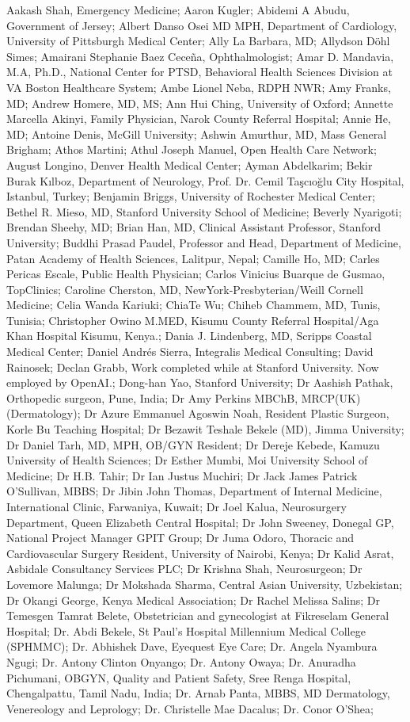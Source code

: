 Aakash Shah, Emergency Medicine; Aaron Kugler; Abidemi A Abudu, Government of Jersey; Albert Danso Osei MD MPH, Department of Cardiology, University of Pittsburgh Medical Center; Ally La Barbara, MD; Allydson Döhl Simes; Amairani Stephanie Baez Ceceña, Ophthalmologist; Amar D. Mandavia, M.A, Ph.D., National Center for PTSD, Behavioral Health Sciences Division at VA Boston Healthcare System; Ambe Lionel Neba, RDPH NWR; Amy Franks, MD; Andrew Homere, MD, MS; Ann Hui Ching, University of Oxford; Annette Marcella Akinyi, Family Physician, Narok County Referral Hospital; Annie He, MD; Antoine Denis, McGill University; Ashwin Amurthur, MD, Mass General Brigham; Athos Martini; Athul Joseph Manuel, Open Health Care Network; August Longino, Denver Health Medical Center; Ayman Abdelkarim; Bekir Burak Kılboz, Department of Neurology, Prof. Dr. Cemil Taşcıoğlu City Hospital, Istanbul, Turkey; Benjamin Briggs, University of Rochester Medical Center; Bethel R. Mieso, MD, Stanford University School of Medicine; Beverly Nyarigoti; Brendan Sheehy, MD; Brian Han, MD, Clinical Assistant Professor, Stanford University; Buddhi Prasad Paudel, Professor and Head, Department of Medicine, Patan Academy of Health Sciences, Lalitpur, Nepal; Camille Ho, MD; Carles Pericas Escale, Public Health Physician; Carlos Vinicius Buarque de Gusmao, TopClinics; Caroline Cherston, MD, NewYork-Presbyterian/Weill Cornell Medicine; Celia Wanda Kariuki; ChiaTe Wu; Chiheb Chammem, MD, Tunis, Tunisia; Christopher Owino M.MED, Kisumu County Referral Hospital/Aga Khan Hospital Kisumu, Kenya.; Dania J. Lindenberg, MD, Scripps Coastal Medical Center; Daniel Andrés Sierra, Integralis Medical Consulting; David Rainosek; Declan Grabb, Work completed while at Stanford University. Now employed by OpenAI.; Dong-han Yao, Stanford University; Dr Aashish Pathak, Orthopedic surgeon, Pune, India; Dr Amy Perkins MBChB, MRCP(UK) (Dermatology); Dr Azure Emmanuel Agoswin Noah, Resident Plastic Surgeon, Korle Bu Teaching Hospital; Dr Bezawit Teshale Bekele (MD), Jimma University; Dr Daniel Tarh, MD, MPH, OB/GYN Resident; Dr Dereje Kebede, Kamuzu University of Health Sciences; Dr Esther Mumbi, Moi University School of Medicine; Dr H.B. Tahir; Dr Ian Justus Muchiri; Dr Jack James Patrick O'Sullivan, MBBS; Dr Jibin John Thomas, Department of Internal Medicine, International Clinic, Farwaniya, Kuwait; Dr Joel Kalua, Neurosurgery Department, Queen Elizabeth Central Hospital; Dr John Sweeney, Donegal GP, National Project Manager GPIT Group; Dr Juma Odoro, Thoracic and Cardiovascular Surgery Resident, University of Nairobi, Kenya; Dr Kalid Asrat, Asbidale Consultancy Services PLC; Dr Krishna Shah, Neurosurgeon; Dr Lovemore Malunga; Dr Mokshada Sharma, Central Asian University, Uzbekistan; Dr Okangi George, Kenya Medical Association; Dr Rachel Melissa Salins; Dr Temesgen Tamrat Belete, Obstetrician and gynecologist at Fikreselam General Hospital; Dr. Abdi Bekele, St Paul's Hospital Millennium Medical College (SPHMMC); Dr. Abhishek Dave, Eyequest Eye Care; Dr. Angela Nyambura Ngugi; Dr. Antony Clinton Onyango; Dr. Antony Owaya; Dr. Anuradha Pichumani, OBGYN, Quality and Patient Safety, Sree Renga Hospital, Chengalpattu, Tamil Nadu, India; Dr. Arnab Panta, MBBS, MD Dermatology, Venereology and Leprology; Dr. Christelle Mae Dacalus; Dr. Conor O'Shea; 